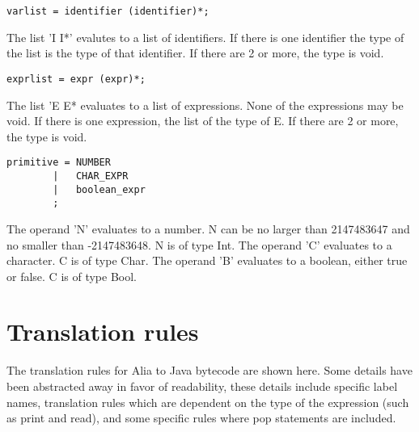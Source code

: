 \documentclass[paper=a4, fontsize=11pt]{article}
\numberwithin{equation}{section}		%
\numberwithin{figure}{section}			%
\numberwithin{table}{section}				%
\begin{document}
\begin{verbatim}
varlist = identifier (identifier)*;
\end{verbatim}
The list 'I I*' evalutes to a list of identifiers. If there is one identifier the type of the list is the type of that identifier. If there are 2 or more, the type is void.
\begin{verbatim}
exprlist = expr (expr)*;
\end{verbatim}
The list 'E E* evaluates to a list of expressions. None of the expressions may be void. If there is one expression, the list of the type of E. If there are 2 or more, the type is void.
\begin{verbatim}	
primitive =	NUMBER
		|	CHAR_EXPR
		|	boolean_expr
		;
\end{verbatim}
The operand 'N' evaluates to a number. N can be no larger than 2147483647 and no smaller than -2147483648. N is of type Int.
The operand 'C' evaluates to a character. C is of type Char.
The operand 'B' evaluates to a boolean, either true or false. C is of type Bool.

\section{Translation rules} %
The translation rules for Alia to Java bytecode are shown here. Some details have been abstracted away in favor of readability, these details include specific label names, translation rules which are dependent on the type of the expression (such as print and read), and some specific rules where pop statements are included.
\end{document}
